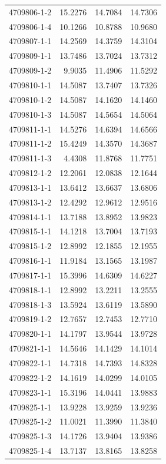 \begin{longtable}{lrrr}
4709806-1-2 & 15.2276 & 14.7084 & 14.7306 \\
4709806-1-4 & 10.1266 & 10.8788 & 10.9680 \\
4709807-1-1 & 14.2569 & 14.3759 & 14.3104 \\
4709809-1-1 & 13.7486 & 13.7024 & 13.7312 \\
4709809-1-2 & 9.9035 & 11.4906 & 11.5292 \\
4709810-1-1 & 14.5087 & 13.7407 & 13.7326 \\
4709810-1-2 & 14.5087 & 14.1620 & 14.1460 \\
4709810-1-3 & 14.5087 & 14.5654 & 14.5064 \\
4709811-1-1 & 14.5276 & 14.6394 & 14.6566 \\
4709811-1-2 & 15.4249 & 14.3570 & 14.3687 \\
4709811-1-3 & 4.4308 & 11.8768 & 11.7751 \\
4709812-1-2 & 12.2061 & 12.0838 & 12.1644 \\
4709813-1-1 & 13.6412 & 13.6637 & 13.6806 \\
4709813-1-2 & 12.4292 & 12.9612 & 12.9516 \\
4709814-1-1 & 13.7188 & 13.8952 & 13.9823 \\
4709815-1-1 & 14.1218 & 13.7004 & 13.7193 \\
4709815-1-2 & 12.8992 & 12.1855 & 12.1955 \\
4709816-1-1 & 11.9184 & 13.1565 & 13.1987 \\
4709817-1-1 & 15.3996 & 14.6309 & 14.6227 \\
4709818-1-1 & 12.8992 & 13.2211 & 13.2555 \\
4709818-1-3 & 13.5924 & 13.6119 & 13.5890 \\
4709819-1-2 & 12.7657 & 12.7453 & 12.7710 \\
4709820-1-1 & 14.1797 & 13.9544 & 13.9728 \\
4709821-1-1 & 14.5646 & 14.1429 & 14.1014 \\
4709822-1-1 & 14.7318 & 14.7393 & 14.8328 \\
4709822-1-2 & 14.1619 & 14.0299 & 14.0105 \\
4709823-1-1 & 15.3196 & 14.0441 & 13.9883 \\
4709825-1-1 & 13.9228 & 13.9259 & 13.9236 \\
4709825-1-2 & 11.0021 & 11.3990 & 11.3840 \\
4709825-1-3 & 14.1726 & 13.9404 & 13.9386 \\
4709825-1-4 & 13.7137 & 13.8165 & 13.8258 \\

\end{longtable}
